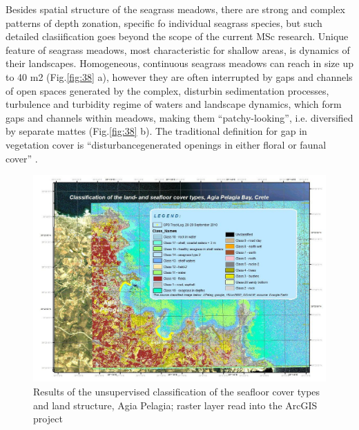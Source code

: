 \documentclass[10pt, a4paper]{article}
\begin{document}
Besides spatial structure of the seagrass meadows, there are strong and complex patterns of depth zonation, specific fo individual
seagrass species, but such detailed clasiification goes beyond the scope of the current MSc research.
Unique feature of seagrass meadows, most characteristic for shallow areas, is dynamics of their
landscapes. Homogeneous, continuous seagrass meadows can reach in size up to 40 m2 (Fig.\ref{fig:38} a),
however they are often interrupted by gaps and channels of open spaces generated by the complex,
disturbin sedimentation processes, turbulence and turbidity regime of waters and landscape dynamics,
which form gaps and channels within meadows, making them “patchy-looking”, i.e. diversified by
separate mattes (Fig.\ref{fig:38} b). The traditional definition for gap in vegetation cover is “disturbancegenerated
openings in either floral or faunal cover” \cite{Connell78}\label{Connell78}.

\begin{figure}[h]
\begin{center}
\includegraphics[scale=0.25]{Fig-39.jpg}
\caption{Results of the unsupervised classification of the seafloor cover types and land structure, Agia Pelagia; raster layer read into the ArcGIS project}
\label{fig:41}
\end{center}
\end{figure}
\end{document}
